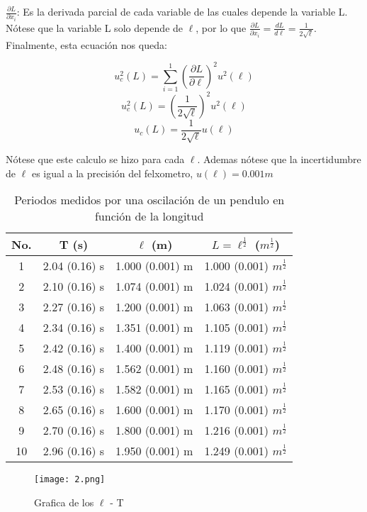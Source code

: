 \documentclass[12pt,a4paper]{article}
\begin{document}
$\frac{\partial L}{\partial x_i}$: Es la derivada parcial de cada variable de las cuales depende la variable L. Nótese que la variable L solo depende de $\ell$, por lo que $\frac{\partial L}{\partial x_i} = \frac{d L}{d \ell} = \frac{1}{2\sqrt{\ell}}$.\\

Finalmente, esta ecuación nos queda:

\[u^2_c (L) = \sum_{i = 1}^1 \left( \frac{\partial L}{\partial \ell}\right)^2 u^2(\ell)\]
\[u^2_c (L) =\left(\frac{1}{2\sqrt{\ell}}\right)^2 u^2(\ell)\]
\[u_c (L) = \frac{1}{2\sqrt{\ell}} u(\ell)\]

Nótese que este calculo se hizo para cada $\ell$. Ademas nótese que la incertidumbre de $\ell$ es igual a la precisión del felxometro, $u(\ell) = 0.001 m$ 



\begin{table}[h!]
\begin{center}
\begin{tabular}{|c|c|c|c|}
\hline
No. & T (s) & $\ell$ (m) & $L = \ell^{\frac{1}{2}}$ ($m^{\frac{1}{2}}$)\\
\hline
1 & 2.04 (0.16) s & 1.000 (0.001) m & 1.000 (0.001) $m^{\frac{1}{2}}$ \\ \hline
2 & 2.10 (0.16) s & 1.074 (0.001) m & 1.024 (0.001) $m^{\frac{1}{2}}$ \\ \hline
3 & 2.27 (0.16) s & 1.200 (0.001) m & 1.063 (0.001) $m^{\frac{1}{2}}$ \\ \hline
4 & 2.34 (0.16) s & 1.351 (0.001) m & 1.105 (0.001) $m^{\frac{1}{2}}$ \\ \hline
5 & 2.42 (0.16) s & 1.400 (0.001) m & 1.119 (0.001) $m^{\frac{1}{2}}$ \\ \hline
6 & 2.48 (0.16) s & 1.562 (0.001) m & 1.160 (0.001) $m^{\frac{1}{2}}$ \\ \hline
7 & 2.53 (0.16) s & 1.582 (0.001) m & 1.165 (0.001) $m^{\frac{1}{2}}$ \\ \hline
8 & 2.65 (0.16) s & 1.600 (0.001) m & 1.170 (0.001) $m^{\frac{1}{2}}$ \\ \hline
9 & 2.70 (0.16) s & 1.800 (0.001) m & 1.216 (0.001) $m^{\frac{1}{2}}$ \\ \hline
10 & 2.96 (0.16) s & 1.950 (0.001) m & 1.249 (0.001) $m^{\frac{1}{2}}$ \\ \hline
\end{tabular}
\caption{Periodos medidos por una oscilación de un pendulo en función de la longitud}
\end{center}

\end{table}
\begin{figure}[h!]
\centering
\texttt{[image: 2.png]}
\caption{Grafica de los $\ell$ - T}
\end{figure}
\end{document}

